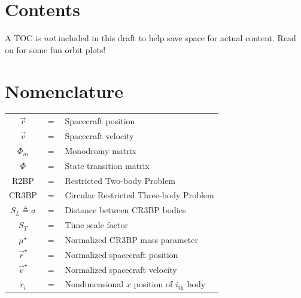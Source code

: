 \documentclass[conf]{new-aiaa}
\begin{document}
\begin{multicols*}{2}

\section*{Contents}
A TOC is \textit{not} included in this draft 
to help save space for actual content. 
Read on for some fun orbit plots!

\section{Nomenclature}
\begin{flushleft}
\begin{tabularx}{\columnwidth}{ccl}
    $\overrightarrow{r}$ & $=$ & Spacecraft position \\
    $\overrightarrow{v}$ & $=$ & Spacecraft velocity \\
    $\Phi_m$             & $=$ & Monodromy matrix \\
    $\Phi$               & $=$ & State transition matrix \\
    R2BP                 & $=$ & Restricted Two-body Problem \\
    CR3BP                & $=$ & Circular Restricted Three-body Problem \\
    $S_L \triangleq a$   & $=$ & Distance between CR3BP bodies \\
    $S_T$                & $=$ & Time scale factor \\
    $\mu^\star$ & $=$    & Normalized CR3BP mass parameter \\
    $\overrightarrow{r}^\star$ & $=$ & Normalized spacecraft position \\
    $\overrightarrow{v}^\star$ & $=$ & Normalized spacecraft velocity \\
    $r_i$                & $=$ & Nondimensional $x$ position of $i_{\text{th}}$ body \\ 
\end{tabularx}
\end{flushleft}


\end{multicols*}
\end{document}
